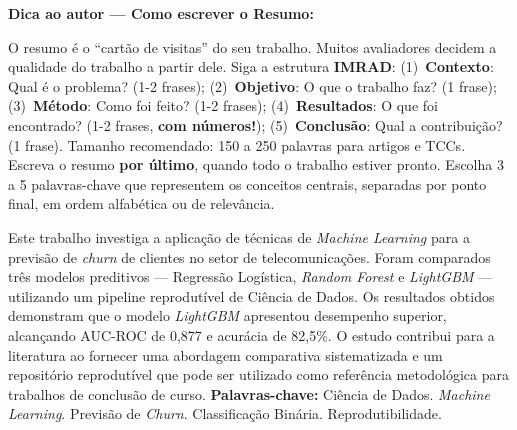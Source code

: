 \documentclass[
    article,
    12pt,
    oneside,
    a4paper,
    english,
    brazilian
    ]{abntex2}
\numberwithin{equation}{section}
\newenvironment{dica}{%
    \par\medskip
    \color{blue!60!black}\small\itshape
}{%
    \par\medskip
}
\begin{document}
\pretextual
\maketitle
\newpage

\begin{resumo}

\begin{dica}
\noindent\textbf{Dica ao autor — Como escrever o Resumo:}

O resumo é o ``cartão de visitas'' do seu trabalho. Muitos avaliadores decidem a qualidade do trabalho a partir dele. Siga a estrutura \textbf{IMRAD}: (1)~\textbf{Contexto}: Qual é o problema? (1-2 frases); (2)~\textbf{Objetivo}: O que o trabalho faz? (1 frase); (3)~\textbf{Método}: Como foi feito? (1-2 frases); (4)~\textbf{Resultados}: O que foi encontrado? (1-2 frases, \textbf{com números!}); (5)~\textbf{Conclusão}: Qual a contribuição? (1 frase). Tamanho recomendado: 150 a 250 palavras para artigos e TCCs. Escreva o resumo \textbf{por último}, quando todo o trabalho estiver pronto. Escolha 3 a 5 palavras-chave que representem os conceitos centrais, separadas por ponto final, em ordem alfabética ou de relevância.
\end{dica}

\noindent Este trabalho investiga a aplicação de técnicas de \textit{Machine Learning} para a previsão de \textit{churn} de clientes no setor de telecomunicações. Foram comparados três modelos preditivos --- Regressão Logística, \textit{Random Forest} e \textit{LightGBM} --- utilizando um pipeline reprodutível de Ciência de Dados. Os resultados obtidos demonstram que o modelo \textit{LightGBM} apresentou desempenho superior, alcançando AUC-ROC de 0,877 e acurácia de 82,5\%. O estudo contribui para a literatura ao fornecer uma abordagem comparativa sistematizada e um repositório reprodutível que pode ser utilizado como referência metodológica para trabalhos de conclusão de curso.
\newline
\noindent \textbf{Palavras-chave:} Ciência de Dados. \textit{Machine Learning}. Previsão de \textit{Churn}. Classificação Binária. Reprodutibilidade.
\end{resumo}
\end{document}
